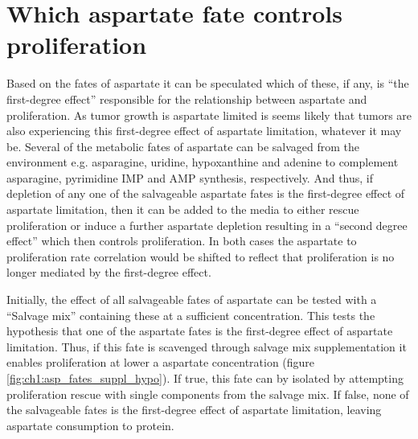 \section{Which aspartate fate controls proliferation}
Based on the fates of aspartate it can be speculated which of these, if any, is ``the first-degree effect'' responsible for the relationship between aspartate and proliferation.
As tumor growth is aspartate limited is seems likely that tumors are also experiencing this first-degree effect of aspartate limitation, whatever it may be.
Several of the metabolic fates of aspartate can be salvaged from the environment e.g. asparagine, uridine, hypoxanthine and adenine to complement asparagine, pyrimidine IMP and AMP synthesis, respectively.
And thus, if depletion of any one of the salvageable aspartate fates is the first-degree effect of aspartate limitation, then it can be added to the media to either rescue proliferation or induce a further aspartate depletion resulting in a ``second degree effect'' which then controls proliferation.
In both cases the aspartate to proliferation rate correlation would be shifted to reflect that proliferation is no longer mediated by the first-degree effect.

Initially, the effect of all salvageable fates of aspartate can be tested with a ``Salvage mix'' containing these at a sufficient concentration.
This tests the hypothesis that one of the aspartate fates is the first-degree effect of aspartate limitation.
Thus, if this fate is scavenged through salvage mix supplementation it enables proliferation at lower a aspartate concentration (figure \ref{fig:ch1:asp_fates_suppl_hypo}).
If true, this fate can by isolated by attempting proliferation rescue with single components from the salvage mix.
If false, none of the salvageable fates is the first-degree effect of aspartate limitation, leaving aspartate consumption to protein.

